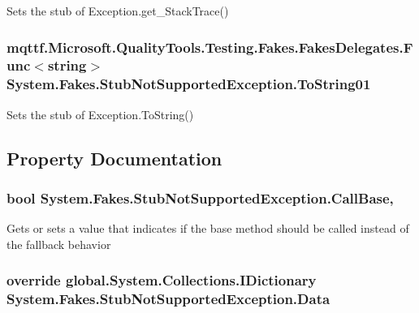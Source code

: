Sets the stub of Exception.\-get\-\_\-\-Stack\-Trace()

\hypertarget{class_system_1_1_fakes_1_1_stub_not_supported_exception_a486cf897d77b4b69fbc85870a9afc709}{
\subsubsection[{To\-String01}]{\setlength{\rightskip}{0pt plus 5cm}mqttf.\-Microsoft.\-Quality\-Tools.\-Testing.\-Fakes.\-Fakes\-Delegates.\-Func$<$string$>$ System.\-Fakes.\-Stub\-Not\-Supported\-Exception.\-To\-String01}}\label{class_system_1_1_fakes_1_1_stub_not_supported_exception_a486cf897d77b4b69fbc85870a9afc709}


Sets the stub of Exception.\-To\-String()



\subsection{Property Documentation}
\hypertarget{class_system_1_1_fakes_1_1_stub_not_supported_exception_a6ac7ce43d34c3782a0f53ece7effb77f}{
\subsubsection[{Call\-Base}]{\setlength{\rightskip}{0pt plus 5cm}bool System.\-Fakes.\-Stub\-Not\-Supported\-Exception.\-Call\-Base\hspace{0.3cm}{\ttfamily [get]}, {\ttfamily [set]}}}\label{class_system_1_1_fakes_1_1_stub_not_supported_exception_a6ac7ce43d34c3782a0f53ece7effb77f}


Gets or sets a value that indicates if the base method should be called instead of the fallback behavior

\hypertarget{class_system_1_1_fakes_1_1_stub_not_supported_exception_ac5f63222cd9b061d69575831d125d8b9}{
\subsubsection[{Data}]{\setlength{\rightskip}{0pt plus 5cm}override global.\-System.\-Collections.\-I\-Dictionary System.\-Fakes.\-Stub\-Not\-Supported\-Exception.\-Data\hspace{0.3cm}{\ttfamily [get]}}}\label{class_system_1_1_fakes_1_1_stub_not_supported_exception_ac5f63222cd9b061d69575831d125d8b9}



